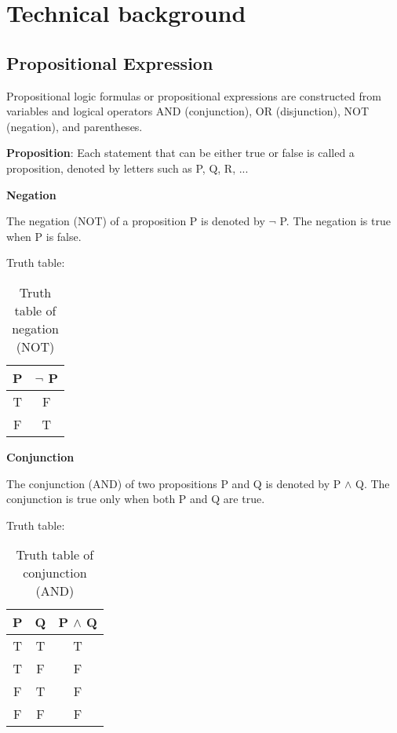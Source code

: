 \section{Technical background}
\subsection{Propositional Expression}
Propositional logic formulas or propositional expressions are constructed from variables
and logical operators AND (conjunction), OR (disjunction), NOT (negation), and
parentheses.

\textbf{Proposition}: Each statement that can be either true or false is called a proposition,
denoted by letters such as P, Q, R, ...

\textbf{Negation}

The negation (NOT) of a proposition P is denoted by $\lnot$ P. The negation
is true when P is false.

Truth table:
\begin{table}[H]
    \centering
    \caption{Truth table of negation (NOT)}
    \label{tab:truth_table_negation}
    \begin{tabular}{|c|c|}
        \hline
        P & $\lnot$ P \\
        \hline
        T & F         \\
        F & T         \\
        \hline
    \end{tabular}
\end{table}

\textbf{Conjunction}

The conjunction (AND) of two propositions P and Q is denoted by P
$\land$ Q. The conjunction is true only when both P and Q are true.

Truth table:
\begin{table}[H]
    \centering
    \caption{Truth table of conjunction (AND)}
    \label{tab:truth_table_conjunction}
    \begin{tabular}{|c|c|c|}
        \hline
        P & Q & P $\land$ Q \\
        \hline
        T & T & T           \\
        T & F & F           \\
        F & T & F           \\
        F & F & F           \\
        \hline
    \end{tabular}
\end{table}

